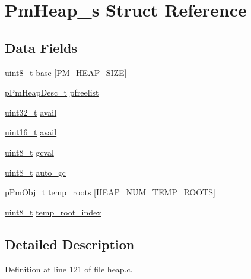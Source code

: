 \hypertarget{struct_pm_heap__s}{\section{Pm\-Heap\-\_\-s Struct Reference}
\label{struct_pm_heap__s}
}
\subsection*{Data Fields}
\begin{DoxyCompactItemize}
\item 
\hyperlink{stdint_8h_aba7bc1797add20fe3efdf37ced1182c5}{uint8\-\_\-t} \hyperlink{struct_pm_heap__s_a865b0a08acab0ab3e3bf5c87781266e1}{base} \mbox{[}P\-M\-\_\-\-H\-E\-A\-P\-\_\-\-S\-I\-Z\-E\mbox{]}
\item 
\hyperlink{heap_8c_a58577aaeb605da8ad6db3900dbb9a7b8}{p\-Pm\-Heap\-Desc\-\_\-t} \hyperlink{struct_pm_heap__s_ac40c1d519ae89ad083284a851d9bb64b}{pfreelist}
\item 
\hyperlink{stdint_8h_a435d1572bf3f880d55459d9805097f62}{uint32\-\_\-t} \hyperlink{struct_pm_heap__s_acb9c0e763130e1b4efd9d45689f721b2}{avail}
\item 
\hyperlink{stdint_8h_a273cf69d639a59973b6019625df33e30}{uint16\-\_\-t} \hyperlink{struct_pm_heap__s_aee628bdf2886b2fa5ff3dae1506cde2c}{avail}
\item 
\hyperlink{stdint_8h_aba7bc1797add20fe3efdf37ced1182c5}{uint8\-\_\-t} \hyperlink{struct_pm_heap__s_a24840745d087fe4979cc7bd52481d196}{gcval}
\item 
\hyperlink{stdint_8h_aba7bc1797add20fe3efdf37ced1182c5}{uint8\-\_\-t} \hyperlink{struct_pm_heap__s_a553d5a18727fb75341f9b13e722c0426}{auto\-\_\-gc}
\item 
\hyperlink{obj_8h_af293479fa3f9d92b941ee7445ad3960e}{p\-Pm\-Obj\-\_\-t} \hyperlink{struct_pm_heap__s_a482ae8f2ae7c1e4644b292eec09aeb87}{temp\-\_\-roots} \mbox{[}H\-E\-A\-P\-\_\-\-N\-U\-M\-\_\-\-T\-E\-M\-P\-\_\-\-R\-O\-O\-T\-S\mbox{]}
\item 
\hyperlink{stdint_8h_aba7bc1797add20fe3efdf37ced1182c5}{uint8\-\_\-t} \hyperlink{struct_pm_heap__s_a47cfb967bec11fba2e6fb8405049aaad}{temp\-\_\-root\-\_\-index}
\end{DoxyCompactItemize}


\subsection{Detailed Description}


Definition at line 121 of file heap.\-c.



